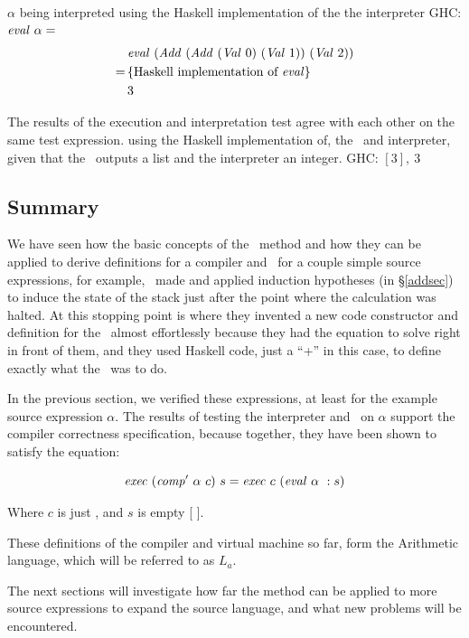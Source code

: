 \documentclass {article}
\begin{document}
$\alpha$ being interpreted
using the Haskell implementation of the the interpreter
GHC: \( \mathit{eval\ } \alpha = \)
\begin{align*}
&\mathit{eval\ } (\mathit{Add\ } (\mathit{Add\ } (\mathit{Val\ } 0)\ (\mathit{Val\ } 1))\ (\mathit{Val\ } 2)) \\
=\, & \{ \mbox{Haskell implementation of \textit{eval}} \} \\
&3
\end{align*}

The results of the execution and interpretation test
agree with each other on the same test expression.
using the Haskell implementation of, the \vm\ and interpreter,
given that the \vm\ outputs a list and the interpreter an integer.
GHC: \( [3],\ 3 \)

\subsection{Summary}

We have seen how the basic concepts of the \BH\ method and
how they can be applied to derive definitions
for a compiler and \vm\ for a couple simple source 
expressions, for example, \BH\ made and applied induction
hypotheses (in \S\ref{addsec}) to induce 
the state of the stack just after the
point where the calculation was halted.
At this stopping point is where 
they invented a new code constructor and 
definition for the \vm\
almost effortlessly because they had the equation
to solve right in front of them, and they
used Haskell code, just a ``+'' in this case, 
to define exactly what the \vm\ was to do.

In the previous section, we verified these expressions, 
at least for the example source expression $\alpha$.
The results of testing the interpreter and \vm\ on $\alpha$
 support the compiler correctness specification,
because together, they have been shown to satisfy the equation:

\[ \Exec (\Compp \alpha\ c)\ s = \Exec c\ (\evalf \alpha\ : s) \]

\noindent Where $c$ is just \HALTt, and $s$ is empty [ ].

These definitions of the compiler and virtual machine so far,
form the Arithmetic language, which will be referred to as $L_a$.

The next sections will investigate how 
far the method can be applied to
more source expressions to expand the source language,
and what new problems will be encountered.
\end{document}
